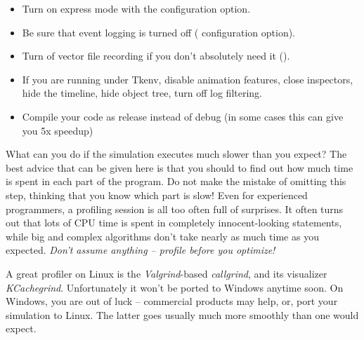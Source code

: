 \begin{itemize}
  \item Turn on express mode with the  configuration option.
  \item Be sure that event logging is turned off ( configuration option).
  \item Turn of vector file recording if you don't absolutely need it ().
  \item If you are running under Tkenv, disable animation features, close inspectors,
        hide the timeline, hide object tree, turn off log filtering.
  \item Compile your code as release instead of debug (in some cases this can give you 5x speedup)
\end{itemize}


What can you do if the simulation executes much slower than you expect?
The best advice that can be given here is that you should
 to find out how much time is spent in each
part of the program. Do not make the mistake of omitting this step,
thinking that you know which part is slow! Even for experienced
programmers, a profiling session is all too often full of surprises.
It often turns out that lots of CPU time is spent in completely
innocent-looking statements, while big and complex algorithms
don't take nearly as much time as you expected. \textit{Don't assume anything
-- profile before you optimize!}

A great profiler on Linux is the \textit{Valgrind}-based
\textit{callgrind}, and its visualizer \textit{KCachegrind}.
Unfortunately it won't be ported to Windows anytime soon.
On Windows, you are out of luck -- commercial products may help, or,
port your simulation to Linux. The latter goes usually much more smoothly
than one would expect.


%
%
%

